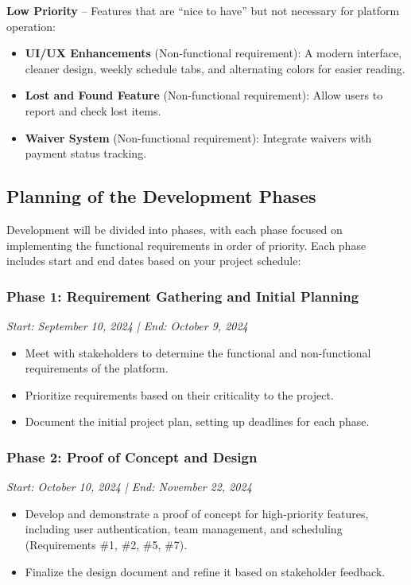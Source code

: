 \documentclass[12pt]{article}
\begin{document}
\textbf{Low Priority} – Features that are “nice to have” but not necessary for platform operation:
\begin{itemize}
    \item \textbf{UI/UX Enhancements} (Non-functional requirement): A modern interface, cleaner design, weekly schedule tabs, and alternating colors for easier reading.
    \item \textbf{Lost and Found Feature} (Non-functional requirement): Allow users to report and check lost items.
    \item \textbf{Waiver System} (Non-functional requirement): Integrate waivers with payment status tracking.
\end{itemize}

\subsection{Planning of the Development Phases}
Development will be divided into phases, with each phase focused on implementing the functional requirements in order of priority. Each phase includes start and end dates based on your project schedule:

\subsubsection{Phase 1: Requirement Gathering and Initial Planning}
\textit{Start: September 10, 2024 | End: October 9, 2024}
\begin{itemize}
    \item Meet with stakeholders to determine the functional and non-functional requirements of the platform.
    \item Prioritize requirements based on their criticality to the project.
    \item Document the initial project plan, setting up deadlines for each phase.
\end{itemize}

\subsubsection{Phase 2: Proof of Concept and Design}
\textit{Start: October 10, 2024 | End: November 22, 2024}
\begin{itemize}
    \item Develop and demonstrate a proof of concept for high-priority features, including user authentication, team management, and scheduling (Requirements \#1, \#2, \#5, \#7).
    \item Finalize the design document and refine it based on stakeholder feedback.
\end{itemize}
\end{document}
